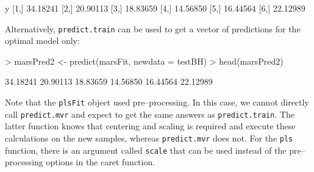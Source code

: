 \documentclass[12pt]{article}
\newcommand{\code}[1]{\mbox{\footnotesize\color{darkblue}\texttt{#1}}}
\newcommand{\pkg}[1]{{\fontseries{b}\selectfont #1}}
\renewcommand{\pkg}[1]{{\textsf{#1}}}
\renewenvironment{Schunk}{\vspace{\topsep}}{\vspace{\topsep}}
\begin{document}
\begin{small}
\begin{Schunk}
\begin{Soutput}
            y
[1,] 34.18241
[2,] 20.90113
[3,] 18.83659
[4,] 14.56850
[5,] 16.44564
[6,] 22.12989
\end{Soutput}
\end{Schunk}
\end{small}
Alternatively, \code{predict.train} can be used to get a vector of predictions for the optimal model only:
\begin{small}
\begin{Schunk}
\begin{Sinput}
> marsPred2 <- predict(marsFit, newdata = testBH)
> head(marsPred2)
\end{Sinput}
\begin{Soutput}
[1] 34.18241 20.90113 18.83659 14.56850 16.44564 22.12989
\end{Soutput}
\end{Schunk}
\end{small}
Note that the \code{plsFit} object used pre--processing. In this
case, we cannot directly call \code{predict.mvr} and expect to get
the same answers as \code{predict.train}. The latter function knows
that centering and scaling is required and execute these calculations
on the new samples, whereas \code{predict.mvr} does not. For the
\code{pls} function, there is an argument called \code{scale} that
can be used instead of the pre--processing options in the
\pkg{caret} function.
\end{document}
